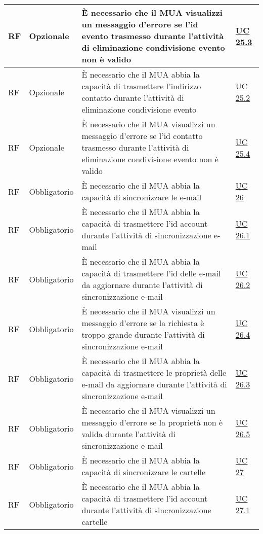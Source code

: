 \begin{longtable}{*{1}{>{\centering\arraybackslash}p{1.5cm}}*{1}{>{\centering\arraybackslash}p{2.5cm}}p{6cm}*{1}{>{\centering\arraybackslash}p{3cm}}}
    \\\hline
    RF & Opzionale & È necessario che il MUA visualizzi un messaggio d'errore se l'id evento trasmesso durante l'attività di eliminazione condivisione evento non è valido & \hyperref[sec:UC25.3]{UC 25.3}
    \\\hline
    RF & Opzionale & È necessario che il MUA abbia la capacità di trasmettere l'indirizzo contatto durante l'attività di eliminazione condivisione evento & \hyperref[sec:UC25.2]{UC 25.2}
    \\\hline
    RF & Opzionale & È necessario che il MUA visualizzi un messaggio d'errore se l'id contatto trasmesso durante l'attività di eliminazione condivisione evento non è valido & \hyperref[sec:UC25.4]{UC 25.4}
    \\\hline
    RF & Obbligatorio & È necessario che il MUA abbia la capacità di sincronizzare le e-mail & \hyperref[sec:UC26]{UC 26}
    \\\hline
    RF & Obbligatorio & È necessario che il MUA abbia la capacità di trasmettere l'id account durante l'attività di sincronizzazione e-mail & \hyperref[sec:UC26.1]{UC 26.1}
    \\\hline
    RF & Obbligatorio & È necessario che il MUA abbia la capacità di trasmettere l'id delle e-mail da aggiornare durante l'attività di sincronizzazione e-mail & \hyperref[sec:UC26.2]{UC 26.2}
    \\\hline
    RF & Obbligatorio & È necessario che il MUA visualizzi un messaggio d'errore se la richiesta è troppo grande durante l'attività di sincronizzazione e-mail & \hyperref[sec:UC26.4]{UC 26.4}
    \\\hline
    RF & Obbligatorio & È necessario che il MUA abbia la capacità di trasmettere le proprietà delle e-mail da aggiornare durante l'attività di sincronizzazione e-mail & \hyperref[sec:UC26.3]{UC 26.3}
    \\\hline
    RF & Obbligatorio & È necessario che il MUA visualizzi un messaggio d'errore se la proprietà non è valida durante l'attività di sincronizzazione e-mail & \hyperref[sec:UC26.5]{UC 26.5}
    \\\hline
    RF & Obbligatorio & È necessario che il MUA abbia la capacità di sincronizzare le cartelle & \hyperref[sec:UC27]{UC 27}
    \\\hline
    RF & Obbligatorio & È necessario che il MUA abbia la capacità di trasmettere l'id account durante l'attività di sincronizzazione cartelle & \hyperref[sec:UC27.1]{UC 27.1}
    \\\hline

\end{longtable}
